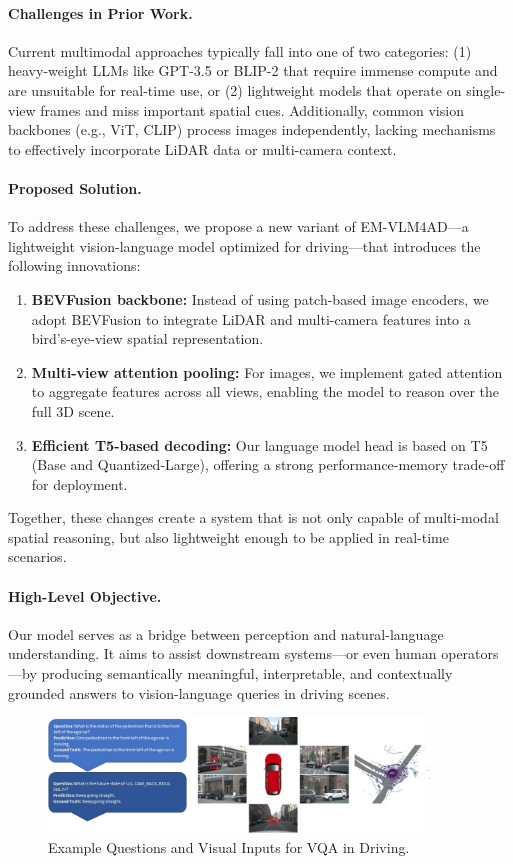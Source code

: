 \documentclass{article} %
\begin{document}
\paragraph{Challenges in Prior Work.}
Current multimodal approaches typically fall into one of two categories: (1) heavy-weight LLMs like GPT-3.5 or BLIP-2 that require immense compute and are unsuitable for real-time use, or (2) lightweight models that operate on single-view frames and miss important spatial cues. Additionally, common vision backbones (e.g., ViT, CLIP) process images independently, lacking mechanisms to effectively incorporate LiDAR data or multi-camera context.

\paragraph{Proposed Solution.}
To address these challenges, we propose a new variant of EM-VLM4AD—a lightweight vision-language model optimized for driving—that introduces the following innovations:
\begin{enumerate}
    \item \textbf{BEVFusion backbone:} Instead of using patch-based image encoders, we adopt BEVFusion to integrate LiDAR and multi-camera features into a bird’s-eye-view spatial representation.
    \item \textbf{Multi-view attention pooling:} For images, we implement gated attention to aggregate features across all views, enabling the model to reason over the full 3D scene.
    \item \textbf{Efficient T5-based decoding:} Our language model head is based on T5 (Base and Quantized-Large), offering a strong performance-memory trade-off for deployment.
\end{enumerate}
Together, these changes create a system that is not only capable of multi-modal spatial reasoning, but also lightweight enough to be applied in real-time scenarios.

\paragraph{High-Level Objective.}
Our model serves as a bridge between perception and natural-language understanding. It aims to assist downstream systems—or even human operators—by producing semantically meaningful, interpretable, and contextually grounded answers to vision-language queries in driving scenes.

\begin{figure}[H]
    \centering
    \includegraphics[width=0.9\textwidth]{Figures/Example_QA.png}
    \caption{Example Questions and Visual Inputs for VQA in Driving.}
    \label{fig:example-vqa}
\end{figure}
\end{document}
